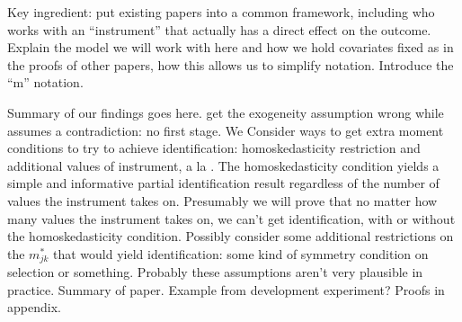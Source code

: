 Key ingredient: put existing papers into a common framework, including \cite{Lewbel} who works with an ``instrument'' that actually has a direct effect on the outcome.
Explain the model we will work with here and how we hold covariates fixed as in the proofs of other papers, how this allows us to simplify notation.
Introduce the ``m'' notation.

Summary of our findings goes here. 
\cite{FL} get the exogeneity assumption wrong while \cite{Mahajan} assumes a contradiction: no first stage.
We Consider ways to get extra moment conditions to try to achieve identification: homoskedasticity restriction and additional values of instrument, a la \cite{Lewbel}.
The homoskedasticity condition yields a simple and informative partial identification result regardless of the number of values the instrument takes on.
Presumably we will prove that no matter how many values the instrument takes on, we can't get identification, with or without the homoskedasticity condition.
Possibly consider some additional restrictions on the $m^*_{jk}$ that would yield identification: some kind of symmetry condition on selection or something.
Probably these assumptions aren't very plausible in practice.
Summary of paper.
Example from development experiment?
Proofs in appendix.
